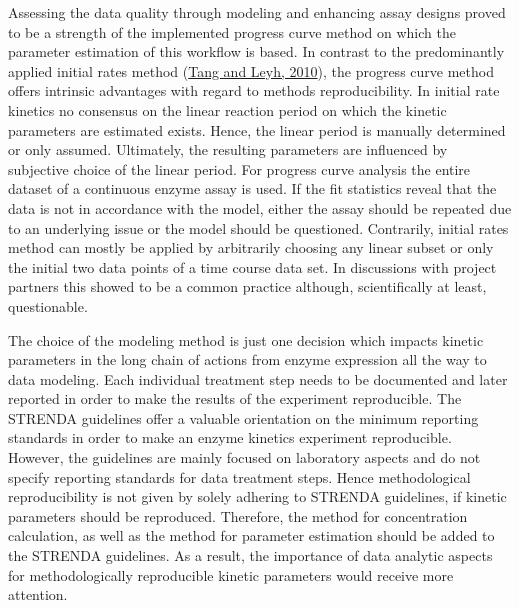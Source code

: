 \documentclass[letterpaper,12pt,english]{jupyterBook}
\begin{document}
\sphinxAtStartPar
Assessing the data quality through modeling and enhancing assay designs proved to be a strength of the implemented progress curve method on which the parameter estimation of this workflow is based. In contrast to the predominantly applied initial rates method (\hyperlink{cite.references:id25}{Tang and Leyh, 2010}), the progress curve method offers intrinsic advantages with regard to methods reproducibility.
In initial rate kinetics no consensus on the linear reaction period on which the kinetic parameters are estimated exists. Hence, the linear period is manually determined or only assumed. Ultimately, the resulting parameters are influenced by subjective choice of the linear period. For progress curve analysis the entire dataset of a continuous enzyme assay is used. If the fit statistics reveal that the data is not in accordance with the model, either the assay should be repeated due to an underlying issue or the model should be questioned. Contrarily, initial rates method can mostly be applied by arbitrarily choosing any linear subset or only the initial two data points of a time course data set. In discussions with project partners this showed to be a common practice although, scientifically at least, questionable.

\sphinxAtStartPar
The choice of the modeling method is just one decision which impacts kinetic parameters in the long chain of actions from enzyme expression all the way to data modeling. Each individual treatment step needs to be documented and later reported in order to make the results of the experiment reproducible. The STRENDA guidelines offer a valuable orientation on the minimum reporting standards in order to make an enzyme kinetics experiment reproducible. However, the guidelines are mainly focused on laboratory aspects and do not specify reporting standards for data treatment steps. Hence methodological reproducibility is not given by solely adhering to STRENDA guidelines, if kinetic parameters should be reproduced. Therefore, the method for concentration calculation, as well as the method for parameter estimation should be added to the STRENDA guidelines. As a result, the importance of data analytic aspects for methodologically reproducible kinetic parameters would receive more attention.
\end{document}
